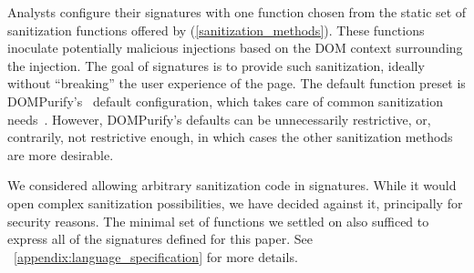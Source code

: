 Analysts configure their signatures with one
function chosen from the static set of sanitization
functions offered by \sys (\autoref{sanitization_methods}). These functions inoculate potentially malicious injections
based on the DOM context surrounding the injection. The goal of
signatures is to provide such sanitization, ideally without ``breaking''
the user experience of the page. The default function preset is DOMPurify's~\cite{10.1007/978-3-319-66399-9_7} default
configuration,
which takes care of common sanitization needs~\cite{safecontent}. However, DOMPurify's defaults can be unnecessarily restrictive, or, contrarily, not restrictive enough, in which cases the other sanitization methods are more desirable.

We considered allowing arbitrary sanitization code in
signatures. While it would open complex sanitization possibilities, we
have decided against it, principally for security reasons. The minimal
set of functions we settled on also sufficed to express all of the
signatures defined for this paper. See ~\autoref{appendix:language_specification} for
more details.


